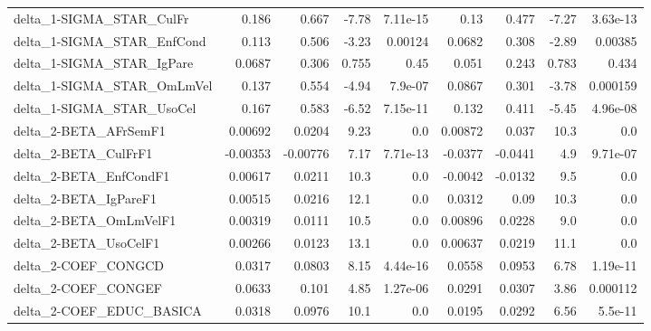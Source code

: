\begin{tabular}{lrrrrrrrr}
delta\_1-SIGMA\_STAR\_CulFr              &       0.186 &        0.667 &   -7.78 & 7.11e-15 &       0.13 &       0.477 &        -7.27 &      3.63e-13 \\
delta\_1-SIGMA\_STAR\_EnfCond            &       0.113 &        0.506 &   -3.23 &  0.00124 &     0.0682 &       0.308 &        -2.89 &       0.00385 \\
delta\_1-SIGMA\_STAR\_IgPare             &      0.0687 &        0.306 &   0.755 &     0.45 &      0.051 &       0.243 &        0.783 &         0.434 \\
delta\_1-SIGMA\_STAR\_OmLmVel            &       0.137 &        0.554 &   -4.94 &  7.9e-07 &     0.0867 &       0.301 &        -3.78 &      0.000159 \\
delta\_1-SIGMA\_STAR\_UsoCel             &       0.167 &        0.583 &   -6.52 & 7.15e-11 &      0.132 &       0.411 &        -5.45 &      4.96e-08 \\
delta\_2-BETA\_AFrSemF1                 &     0.00692 &       0.0204 &    9.23 &      0.0 &    0.00872 &       0.037 &         10.3 &           0.0 \\
delta\_2-BETA\_CulFrF1                  &    -0.00353 &     -0.00776 &    7.17 & 7.71e-13 &    -0.0377 &     -0.0441 &          4.9 &      9.71e-07 \\
delta\_2-BETA\_EnfCondF1                &     0.00617 &       0.0211 &    10.3 &      0.0 &    -0.0042 &     -0.0132 &          9.5 &           0.0 \\
delta\_2-BETA\_IgPareF1                 &     0.00515 &       0.0216 &    12.1 &      0.0 &     0.0312 &        0.09 &         10.3 &           0.0 \\
delta\_2-BETA\_OmLmVelF1                &     0.00319 &       0.0111 &    10.5 &      0.0 &    0.00896 &      0.0228 &          9.0 &           0.0 \\
delta\_2-BETA\_UsoCelF1                 &     0.00266 &       0.0123 &    13.1 &      0.0 &    0.00637 &      0.0219 &         11.1 &           0.0 \\
delta\_2-COEF\_CONGCD                   &      0.0317 &       0.0803 &    8.15 & 4.44e-16 &     0.0558 &      0.0953 &         6.78 &      1.19e-11 \\
delta\_2-COEF\_CONGEF                   &      0.0633 &        0.101 &    4.85 & 1.27e-06 &     0.0291 &      0.0307 &         3.86 &      0.000112 \\
delta\_2-COEF\_EDUC\_BASICA              &      0.0318 &       0.0976 &    10.1 &      0.0 &     0.0195 &      0.0292 &         6.56 &       5.5e-11 \\

\end{tabular}
